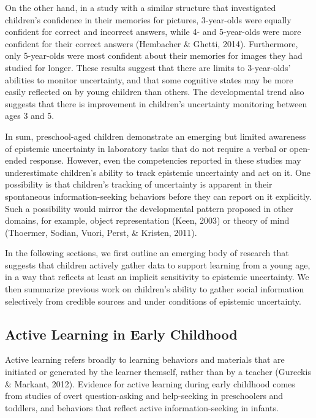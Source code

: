 \documentclass[english,man]{apa6}
\theoremstyle{definition}
\theoremstyle{definition}
\theoremstyle{definition}
\theoremstyle{remark}
\begin{document}
On the other hand, in a study with a similar structure that investigated
children's confidence in their memories for pictures, 3-year-olds were
equally confident for correct and incorrect answers, while 4- and
5-year-olds were more confident for their correct answers (Hembacher \&
Ghetti, 2014). Furthermore, only 5-year-olds were most confident about
their memories for images they had studied for longer. These results
suggest that there are limits to 3-year-olds' abilities to monitor
uncertainty, and that some cognitive states may be more easily reflected
on by young children than others. The developmental trend also suggests
that there is improvement in children's uncertainty monitoring between
ages 3 and 5.

In sum, preschool-aged children demonstrate an emerging but limited
awareness of epistemic uncertainty in laboratory tasks that do not
require a verbal or open-ended response. However, even the competencies
reported in these studies may underestimate children's ability to track
epistemic uncertainty and act on it. One possibility is that children's
tracking of uncertainty is apparent in their spontaneous
information-seeking behaviors before they can report on it explicitly.
Such a possibility would mirror the developmental pattern proposed in
other domains, for example, object representation (Keen, 2003) or theory
of mind (Thoermer, Sodian, Vuori, Perst, \& Kristen, 2011).

In the following sections, we first outline an emerging body of research
that suggests that children actively gather data to support learning
from a young age, in a way that reflects at least an implicit
sensitivity to epistemic uncertainty. We then summarize previous work on
children's ability to gather social information selectively from
credible sources and under conditions of epistemic uncertainty.

\subsection{Active Learning in Early
Childhood}\label{active-learning-in-early-childhood}

Active learning refers broadly to learning behaviors and materials that
are initiated or generated by the learner themself, rather than by a
teacher (Gureckis \& Markant, 2012). Evidence for active learning during
early childhood comes from studies of overt question-asking and
help-seeking in preschoolers and toddlers, and behaviors that reflect
active information-seeking in infants.
\end{document}
